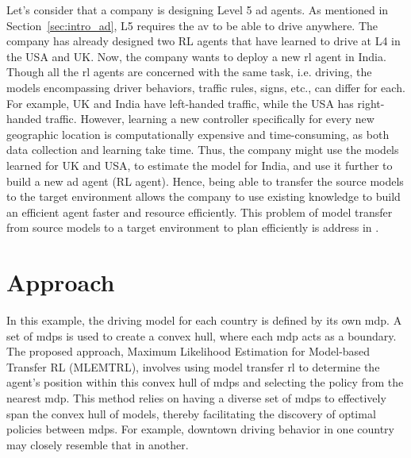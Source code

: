 Let's consider that a company is designing Level 5 \gls{ad} agents. As mentioned in Section~\ref{sec:intro_ad}, L5 requires the \gls{av} to be able to drive anywhere. The company has already designed two RL agents that have learned to drive at L4 in the USA and UK. Now, the company wants to deploy a new \gls{rl} agent in India. 
Though all the \gls{rl} agents are concerned with the same task, i.e. driving, the models encompassing driver behaviors, traffic rules, signs, etc., can differ for each. For example, UK and India have left-handed traffic, while the USA has right-handed traffic. However, learning a new controller specifically for every new geographic location is computationally expensive and time-consuming, as both data collection and learning take time. Thus, the company might use the models learned for UK and USA, to estimate the model for India, and use it further to build a new \gls{ad} agent (RL agent). Hence, being able to transfer the source models to the target environment allows the company to use existing knowledge to build an efficient agent faster and resource efficiently. 
This problem of model transfer from source models to a target environment to plan efficiently is address in \paperTransfer. 

\section{Approach}
In this example, the driving model for each country is defined by its own \gls{mdp}. A set of \gls{mdp}s is used to create a convex hull, where each \gls{mdp} acts as a boundary. 
The proposed approach, Maximum Likelihood Estimation for Model-based Transfer RL (MLEMTRL), involves using model transfer \gls{rl} to determine the agent's position within this convex hull of \gls{mdp}s and selecting the policy from the nearest \gls{mdp}. 
This method relies on having a diverse set of \gls{mdp}s to effectively span the convex hull of models, thereby facilitating the discovery of optimal policies between \gls{mdp}s. For example, downtown driving behavior in one country may closely resemble that in another.



